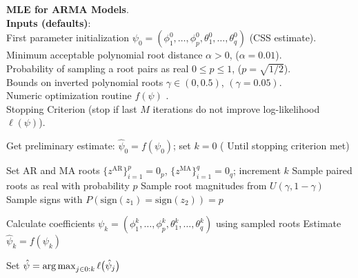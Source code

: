 \begin{algorithm}[ht]
    \SetAlgoNoEnd
   \caption[ARMA MLE]{\textbf{MLE for ARMA Models}. \\
    {\bf Inputs (defaults)}:\\\hspace{\textwidth}
    First parameter initialization $\psi_0 = (\phi^0_1, \ldots, \phi^0_p, \theta^0_1, \ldots, \theta^0_q)$ (CSS estimate).\\\hspace{\textwidth}
    Minimum acceptable polynomial root distance $\alpha > 0$, ($\alpha = 0.01$).\\\hspace{\textwidth}
    Probability of sampling a root pairs as real $0 \leq p \leq 1$, ($p = \sqrt{1/2}$).\\\hspace{\textwidth}
    Bounds on inverted polynomial roots $\gamma \in (0, 0.5)$, $(\gamma = 0.05)$.\\\hspace{\textwidth}
    Numeric optimization routine $f(\psi)$ \cite{gardner1980}.
    \\\hspace{\textwidth}
    Stopping Criterion (stop if last $M$ iterations do not improve log-likelihood $\ell(\psi)$).
    \label{alg:mle}}
Get preliminary estimate: $\hat{\psi}_0 = f(\psi_0)$; set $k = 0$\;
\Repeat( Until stopping criterion met){}{
  Set AR and MA roots $\{z^{\text{AR}}\}_{i = 1}^p = 0_p$, $\{z^{\text{MA}}\}_{i = 1}^q = 0_q$; increment $k$\;
   {
  Sample paired roots as real with probability $p$\;
     {
      Sample root magnitudes from $U(\gamma, 1-\gamma)$\;
      Sample signs with
      $P(\text{sign}(z_1) = \text{sign}(z_2)) = p$\;
    }
  }  %

  Calculate coefficients $\psi_k = (\phi^k_1, \ldots,\phi^k_p, \theta^k_1, \ldots, \theta^k_q)$ using sampled roots\;
  Estimate $\hat{\psi}_k = f(\psi_k)$\;
}  %
  Set $\hat{\psi} = \operatorname*{arg\,max}_{j\in 0:k} \ell\big(\hat{\psi}_j\big)$\;
\end{algorithm}

